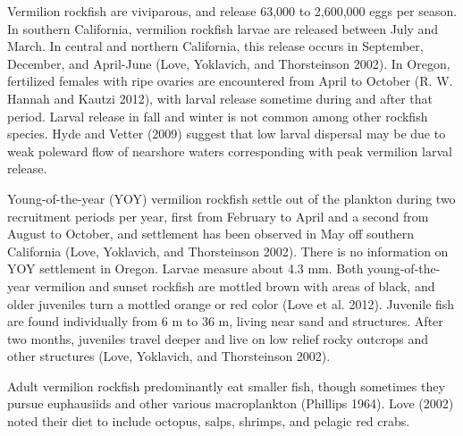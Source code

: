 \documentclass[11pt,
  english,
  a4paper,
]{article}
\begin{document}
Vermilion rockfish are viviparous, and release 63,000 to 2,600,000 eggs per season. In southern California, vermilion rockfish larvae are released between July and March. In central and northern California, this release occurs in September, December, and April-June {(Love, Yoklavich, and Thorsteinson 2002)\leavevmode\tagmcend\tagstructend}. In Oregon, fertilized females with ripe ovaries are encountered from April to October {(R. W. Hannah and Kautzi 2012)\leavevmode\tagmcend\tagstructend}, with larval release sometime during and after that period. Larval release in fall and winter is not common among other rockfish species. Hyde and Vetter {(2009)\leavevmode\tagmcend\tagstructend} suggest that low larval dispersal may be due to weak poleward flow of nearshore waters corresponding with peak vermilion larval release.

\leavevmode\tagmcend\tagstructend\par


Young-of-the-year (YOY) vermilion rockfish settle out of the plankton during two recruitment periods per year, first from February to April and a second from August to October, and settlement has been observed in May off southern California {(Love, Yoklavich, and Thorsteinson 2002)\leavevmode\tagmcend\tagstructend}. There is no information on YOY settlement in Oregon. Larvae measure about 4.3 mm. Both young-of-the-year vermilion and sunset rockfish are mottled brown with areas of black, and older juveniles turn a mottled orange or red color {(Love et al. 2012)\leavevmode\tagmcend\tagstructend}. Juvenile fish are found individually from 6 m to 36 m, living near sand and structures. After two months, juveniles travel deeper and live on low relief rocky outcrops and other structures {(Love, Yoklavich, and Thorsteinson 2002)\leavevmode\tagmcend\tagstructend}.

\leavevmode\tagmcend\tagstructend\par


Adult vermilion rockfish predominantly eat smaller fish, though sometimes they pursue euphausiids and other various macroplankton {(Phillips 1964)\leavevmode\tagmcend\tagstructend}. Love {(2002)\leavevmode\tagmcend\tagstructend} noted their diet to include octopus, salps, shrimps, and pelagic red crabs.
\end{document}
